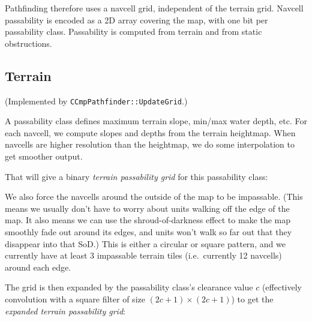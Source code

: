 \documentclass[a4paper,10pt]{article}
\begin{document}
Pathfinding therefore uses a navcell grid, independent of the terrain grid.
Navcell passability is encoded as a 2D array covering the map,
with one bit per passability class.
Passability is computed from terrain and from static obstructions.

\subsection{Terrain}

(Implemented by \texttt{CCmpPathfinder::UpdateGrid}.)

A passability class defines maximum terrain slope, min/max water depth, etc.
For each navcell, we compute slopes and depths from the terrain heightmap.
When navcells are higher resolution than the heightmap, we do some interpolation
to get smoother output.

That will give a binary \emph{terrain passability grid} for this passability class:


We also force the navcells around the outside of the map to be impassable.
(This means we usually don't have to worry about units walking off the edge of the map.
It also means we can use the shroud-of-darkness effect to make the map smoothly fade out
around its edges, and units won't walk so far out that they disappear into that SoD.\@)
This is either a circular or square pattern,
and we currently have at least 3 impassable terrain tiles (i.e.\ currently 12 navcells)
around each edge.

The grid is then expanded by the passability class's clearance value $c$
(effectively convolution with a square filter of size $(2c+1)\times(2c+1)$)
to get the \emph{expanded terrain passability grid}:
\end{document}
